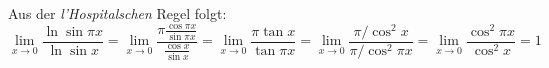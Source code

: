 \documentclass{article}
\begin{document}
\noindent
Aus der \emph{l'Hospitalschen} Regel folgt:
\[ \lim_{x\to0}\frac{\ln\sin\pi x}{\ln\sin x}
 = \lim_{x\to0}\frac{\pi\frac{\cos\pi x}{\sin\pi x}}{\frac{\cos x}{\sin x}}
 = \lim_{x\to0}\frac{\pi\tan x}{\tan\pi x}
 = \lim_{x\to0}\frac{\pi/\cos^2 x}{\pi/\cos^2 \pi x} 
 = \lim_{x\to0}\frac{\cos^2\pi x}{\cos^2 x} = 1 \]
\end{document}
